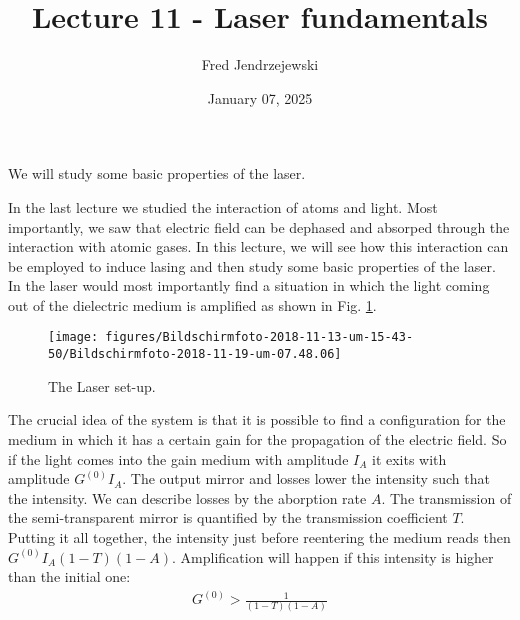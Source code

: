 \documentclass[10pt]{article}
\let\cite\citep
\renewenvironment{abstract}
  {{\bfseries\noindent{\abstractname}\par\nobreak}\footnotesize}
  {\bigskip}
\providecommand\citep{\cite}
\begin{document}
\title{Lecture 11 -  Laser fundamentals}



\author[1]{Fred Jendrzejewski}%
%


\vspace{-1em}



  
  \date{January 07, 2025}


\begingroup
\let\center\flushleft
\let\endcenter\endflushleft
\maketitle
\endgroup





\begin{abstract}
We will study some basic properties of the laser.%
\end{abstract}%



\sloppy


In the last lecture \cite{Jendrzejewski} we studied the interaction of atoms and light. Most importantly, we saw that electric field can be dephased and absorped through the interaction with atomic gases.  In this lecture, we will see how this interaction can be employed to induce lasing and then study some basic properties of the laser. In the laser would most importantly find a situation in which the light coming out of the dielectric medium is amplified as shown in Fig. \ref{370550}.
\begin{figure}[h!]
\begin{center}
\texttt{[image: figures/Bildschirmfoto-2018-11-13-um-15-43-50/Bildschirmfoto-2018-11-19-um-07.48.06]}
\caption{{The Laser set-up.
{\label{370550}}%
}}
\end{center}
\end{figure}

The crucial idea of the system is that it is possible to find a configuration for the medium in which it has a certain gain for the propagation of the electric field. So if the light comes into the gain medium with amplitude $I_A$ it exits with amplitude $G^{(0)}I_A$. The output mirror and losses lower the intensity such that the intensity. We can describe losses by the aborption rate $A$. The transmission of the semi-transparent mirror is quantified by the transmission coefficient $T$. Putting it all together, the intensity just before reentering the medium reads then $G^{(0)}I_A(1-T)(1-A)$. Amplification will happen if this intensity is higher than the initial one:
\begin{align}
G^{(0)}>\frac{1}{(1-T)(1-A)}
\end{align}
\end{document}
